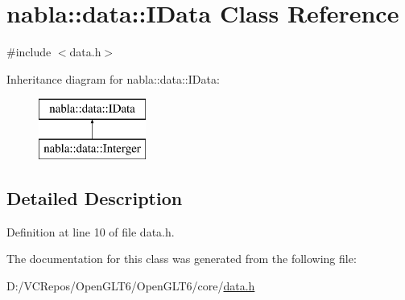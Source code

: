 \hypertarget{classnabla_1_1data_1_1_i_data}{}\section{nabla\+::data\+::I\+Data Class Reference}
\label{classnabla_1_1data_1_1_i_data}


{\ttfamily \#include $<$data.\+h$>$}

Inheritance diagram for nabla\+::data\+::I\+Data\+:\begin{figure}[H]
\begin{center}
\leavevmode
\includegraphics[height=2.000000cm]{classnabla_1_1data_1_1_i_data}
\end{center}
\end{figure}


\subsection{Detailed Description}


Definition at line 10 of file data.\+h.



The documentation for this class was generated from the following file\+:\begin{DoxyCompactItemize}
\item 
D\+:/\+V\+C\+Repos/\+Open\+G\+L\+T6/\+Open\+G\+L\+T6/core/\mbox{\hyperlink{data_8h}{data.\+h}}\end{DoxyCompactItemize}
